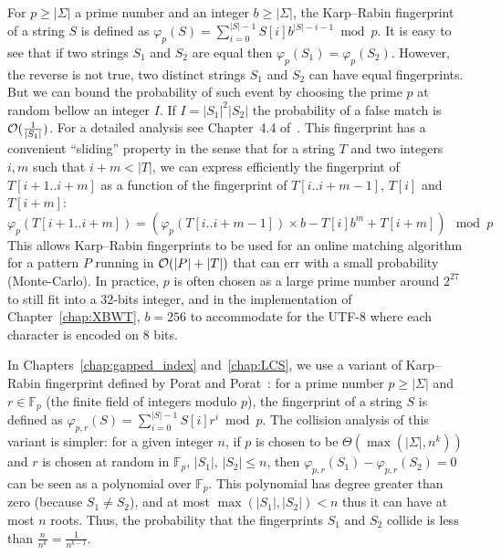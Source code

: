 For $p \geq |\Sigma|$ a prime number and an integer $b\geq |\Sigma|$, the Karp--Rabin fingerprint~\cite{KRfingerprint} of a string $S$ is defined as
$\varphi_{p}(S) = \sum_{i = 0}^{|S|-1}  S[i]b^{|S|-i-1} \bmod p$.
It is easy to see that if two strings $S_1$ and $S_2$ are equal then $\varphi_p(S_1) = \varphi_p(S_2)$. However, the reverse is not true, two distinct strings $S_1$ and $S_2$ can have equal fingerprints.
%
But we can bound the probability of such event by choosing the prime $p$ at random bellow an integer $I$. If $I=|S_1|^2|S_2|$ the probability of a false match is $\mathcal{O}(\frac{1}{|S_1|})$. For a detailed analysis see Chapter~4.4 of~\cite{Gusfield1997}.
This fingerprint has a convenient ``sliding'' property in the sense that for a string $T$ and two integers $i,m$ such that $i+m < |T|$, we can express efficiently the fingerprint of $T[i+1..i+m]$ as a function of the fingerprint of $T[i..i+m-1]$, $T[i]$ and $T[i+m]$:
$$ \varphi_{p}(T[i+1..i+m]) = ( \varphi_{p}(T[i..i+m-1])\times b - T[i]b^{m} + T[i+m]  ) \mod p$$
This allows Karp--Rabin fingerprints to be used for an online matching algorithm for a pattern $P$ running in $\mathcal{O}(|P|+|T|)$ that can err with a small probability (Monte-Carlo).
In practice, $p$ is often chosen as a large prime number around $2^{27}$ to still fit into a 32-bits integer, and in the implementation of Chapter~\ref{chap:XBWT}, $b=256$ to accommodate for the UTF-8 where each character is encoded on 8 bits.

In Chapters~\ref{chap:gapped_index} and~\ref{chap:LCS}, we use a variant of Karp--Rabin fingerprint defined by Porat and Porat~\cite{Porat:09}: 
for a prime number $p\geq |\Sigma|$  and $r \in \mathbb{F}_p$ (the finite field of integers modulo $p$), the fingerprint of a string $S$ is defined as
$\varphi_{p,r}(S) = \sum_{i = 0}^{|S|-1}  S[i]r^{i} \bmod p$.
The collision analysis of this variant is simpler: %
for a given integer $n$, if $p$ is chosen to be $\Theta(\max(|\Sigma|,n^k))$ and $r$ is chosen at random in $\mathbb{F}_p$, $|S_1|$, $|S_2|\leq n$, then $\varphi_{p,r}(S_1) - \varphi_{p,r}(S_2) = 0$ can be seen as a polynomial over $\mathbb{F}_p$. This polynomial has degree greater than zero (because $S_1 \neq S_2$), and at most $\max(|S_1|,|S_2|) < n$ thus it can have at most $n$ roots. Thus, the probability that the fingerprints $S_1$ and $S_2$ collide is less than $\frac{n}{n^k} = \frac{1}{n^{k-1}}$.


